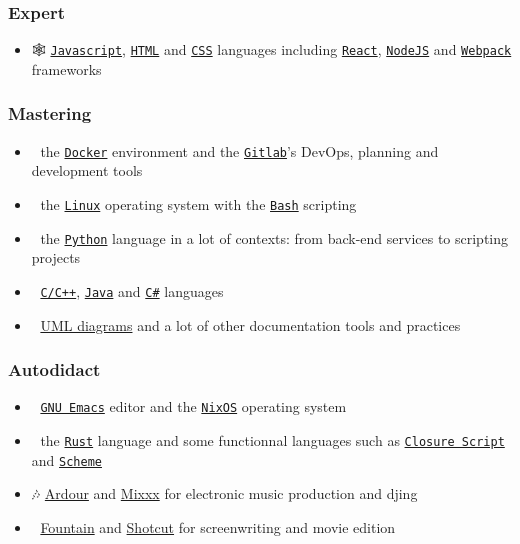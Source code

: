 \documentclass[11pt]{article}
\begin{document}
\subsubsection{Expert}
\label{sec:org434b1c9}
\begin{itemize}
\item 🕸 \href{https://www.javascript.com/}{\texttt{Javascript}}, \href{https://html.spec.whatwg.org/multipage/}{\texttt{HTML}} and \href{https://www.w3.org/Style/CSS/}{\texttt{CSS}} languages including \href{https://reactjs.org/}{\texttt{React}}, \href{https://nodejs.org}{\texttt{NodeJS}} and \href{https://webpack.js.org/}{\texttt{Webpack}} frameworks
\end{itemize}

\subsubsection{Mastering}
\label{sec:org3df9ae4}
\begin{itemize}
\item 🐋 the \href{https://www.docker.com/}{\texttt{Docker}} environment and the \href{https://about.gitlab.com/}{\texttt{Gitlab}}'s DevOps, planning and development tools
\item 🐧 the \href{https://kernel.org/}{\texttt{Linux}} operating system with the \href{https://www.gnu.org/software/bash/}{\texttt{Bash}} scripting
\item 🐍 the \href{https://www.python.org/}{\texttt{Python}} language in a lot of contexts: from back-end services to scripting projects
\item 🤖 \href{https://en.cppreference.com/w/}{\texttt{C/C++}}, \href{https://www.java.com/en/}{\texttt{Java}} and \href{https://dotnet.microsoft.com/en-us/}{\texttt{C\#}} languages
\item 📝 \href{https://www.uml-diagrams.org/}{UML diagrams} and a lot of other documentation tools and practices
\end{itemize}

\subsubsection{Autodidact}
\label{sec:org81755ff}
\begin{itemize}
\item 🐄 \href{https://www.gnu.org/software/emacs/}{\texttt{GNU Emacs}} editor and the \href{https://nixos.org/}{\texttt{NixOS}} operating system
\item 🦀 the \href{https://www.rust-lang.org/}{\texttt{Rust}} language and some functionnal languages such as \href{https://clojurescript.org/}{\texttt{Closure Script}} and \href{http://www.call-cc.org/}{\texttt{Scheme}}
\item 🎶 \href{https://ardour.org/}{Ardour} and \href{https://mixxx.org/}{Mixxx} for electronic music production and djing
\item 🎥 \href{https://fountain.io/}{Fountain} and \href{https://www.shotcut.org/}{Shotcut} for screenwriting and movie edition
\end{itemize}
\end{document}

